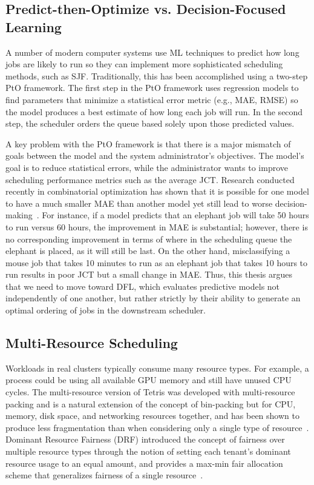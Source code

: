 \subsection{Predict-then-Optimize vs. Decision-Focused Learning}

A number of modern computer systems use ML techniques to predict how long jobs are likely to run so they can implement more sophisticated scheduling methods, such as SJF. Traditionally, this has been accomplished using a two-step PtO framework. The first step in the PtO framework uses regression models to find parameters that minimize a statistical error metric (e.g., MAE, RMSE) so the model produces a best estimate of how long each job will run. In the second step, the scheduler orders the queue based solely upon those predicted values.

\clearpage
A key problem with the PtO framework is that there is a major mismatch of goals between the model and the system administrator's objectives. The model's goal is to reduce statistical errors, while the administrator wants to improve scheduling performance metrics such as the average JCT. Research conducted recently in combinatorial optimization has shown that it is possible for one model to have a much smaller MAE than another model yet still lead to worse decision-making~\cite{mandi2023decision}. For instance, if a model predicts that an elephant job will take 50 hours to run versus 60 hours, the improvement in MAE is substantial; however, there is no corresponding improvement in terms of where in the scheduling queue the elephant is placed, as it will still be last. On the other hand, misclassifying a mouse job that takes 10 minutes to run as an elephant job that takes 10 hours to run results in poor JCT but a small change in MAE. Thus, this thesis argues that we need to move toward DFL, which evaluates predictive models not independently of one another, but rather strictly by their ability to generate an optimal ordering of jobs in the downstream scheduler.

\subsection{Multi-Resource Scheduling}

Workloads in real clusters typically consume many resource types. For example, a process could be using all available GPU memory and still have unused CPU cycles. The multi-resource version of Tetris was developed with multi-resource packing and is a natural extension of the concept of bin-packing but for CPU, memory, disk space, and networking resources together, and has been shown to produce less fragmentation than when considering only a single type of resource~\cite{grandl2014multi}. Dominant Resource Fairness (DRF) introduced the concept of fairness over multiple resource types through the notion of setting each tenant's dominant resource usage to an equal amount, and provides a max-min fair allocation scheme that generalizes fairness of a single resource~\cite{ghodsi2011dominant}.

